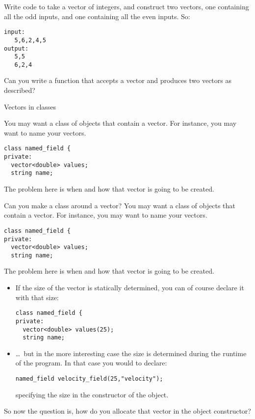 \begin{exercise}
  \label{ex:splitoddeven}
  Write code to take a vector of integers, and construct two
  vectors, one containing all the odd inputs, and one containing all
  the even inputs. So:
\begin{lstlisting}
input:
   5,6,2,4,5
output:
   5,5
   6,2,4
\end{lstlisting}
  Can you write a function that accepts a vector and produces two
  vectors as described?
\end{exercise}

 {Vectors in classes}

You may want a class of objects that contain a vector.
For instance, you may want to name your vectors.
\begin{lstlisting}
class named_field {
private:
  vector<double> values;
  string name;
\end{lstlisting}
The problem here is when and how that vector is going to be created.

\begin{slide}{Can you make a class around a vector?}
  \label{sl:class-with-vector}
You may want a class of objects that contain a vector.
For instance, you may want to name your vectors.
\begin{lstlisting}
class named_field {
private:
  vector<double> values;
  string name;
\end{lstlisting}
The problem here is when and how that vector is going to be created.
\end{slide}

\begin{itemize}
\item If the size of the vector is statically determined, you can of course declare it with that size:
\begin{lstlisting}
class named_field {
private:
  vector<double> values(25);
  string name;
\end{lstlisting}
\item \ldots~but in the more interesting case the size is determined
  during the runtime of the program. In that case you would to declare:
\begin{lstlisting}
named_field velocity_field(25,"velocity");
\end{lstlisting}
specifying the size in the constructor of the object.
\end{itemize}

So now the question is, how do you allocate that vector
in the object constructor?

